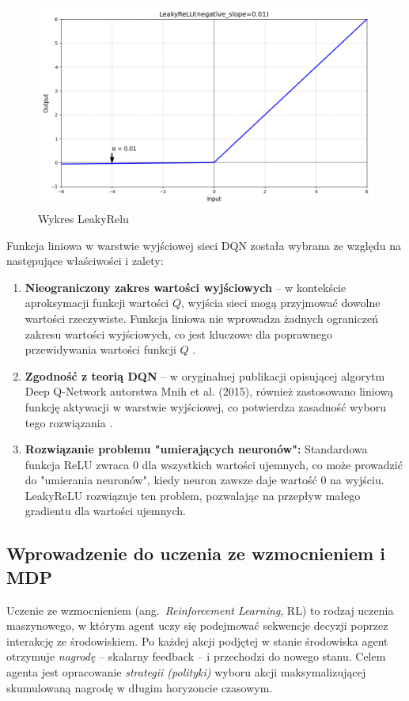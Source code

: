 \documentclass[a4paper,12pt]{article}
\begin{document}
\begin{figure}[H]
    \centering
    \includegraphics[width=1\linewidth]{LeakyRelu.png}
    \caption{Wykres LeakyRelu}
\end{figure}

Funkcja liniowa w warstwie wyjściowej sieci DQN została wybrana ze względu na następujące właściwości i zalety:

\begin{enumerate}[label=\textbf{\arabic*.}, leftmargin=1.5cm]
    \item \textbf{Nieograniczony zakres wartości wyjściowych} – w kontekście aproksymacji funkcji wartości \(Q\), wyjścia sieci mogą przyjmować dowolne wartości rzeczywiste. Funkcja liniowa nie wprowadza żadnych ograniczeń zakresu wartości wyjściowych, co jest kluczowe dla poprawnego przewidywania wartości funkcji \(Q\) \cite{mnih2015human}.

    \item \textbf{Zgodność z teorią DQN} – w oryginalnej publikacji opisującej algorytm Deep Q-Network autorstwa Mnih et al. (2015), również zastosowano liniową funkcję aktywacji w warstwie wyjściowej, co potwierdza zasadność wyboru tego rozwiązania \cite{mnih2015human}.

    \item \textbf{Rozwiązanie problemu "umierających neuronów":} Standardowa funkcja ReLU zwraca 0 dla wszystkich wartości ujemnych, co może prowadzić do "umierania neuronów", kiedy neuron zawsze daje wartość 0 na wyjściu. LeakyReLU rozwiązuje ten problem, pozwalając na przepływ małego gradientu dla wartości ujemnych.
\end{enumerate}

\clearpage 

\subsection{Wprowadzenie do uczenia ze wzmocnieniem i MDP}
Uczenie ze wzmocnieniem (ang.\ \emph{Reinforcement Learning}, RL) to rodzaj uczenia maszynowego, w którym agent uczy się podejmować sekwencje decyzji poprzez interakcję ze środowiskiem. Po każdej akcji podjętej w stanie środowiska agent otrzymuje \emph{nagrodę} – skalarny feedback – i przechodzi do nowego stanu. Celem agenta jest opracowanie \emph{strategii (polityki)} wyboru akcji maksymalizującej skumulowaną nagrodę w długim horyzoncie czasowym.
\end{document}
